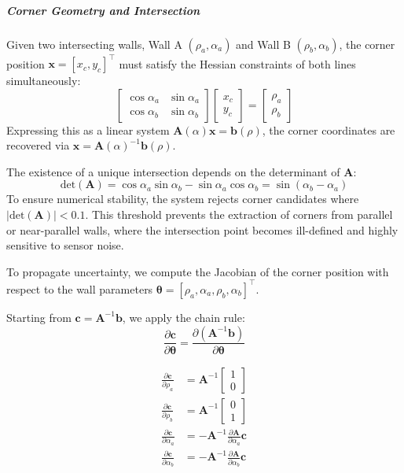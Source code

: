 \documentclass[11pt]{article}
\begin{document}
\subparagraph{Corner Geometry and Intersection}
Given two intersecting walls, Wall A $(\rho_a, \alpha_a)$ and Wall B $(\rho_b, \alpha_b)$, the corner position $\mathbf{x} = [x_c, y_c]^\top$ must satisfy the Hessian constraints of both lines simultaneously:
\begin{equation}
	\begin{bmatrix} \cos \alpha_a & \sin \alpha_a \\ \cos \alpha_b & \sin \alpha_b \end{bmatrix} \begin{bmatrix} x_c \\ y_c \end{bmatrix} = \begin{bmatrix} \rho_a \\ \rho_b \end{bmatrix}
\end{equation}
Expressing this as a linear system $\mathbf{A}(\alpha)\mathbf{x} = \mathbf{b}(\rho)$, the corner coordinates are recovered via $\mathbf{x} = \mathbf{A}(\alpha)^{-1} \mathbf{b}(\rho)$.

The existence of a unique intersection depends on the determinant of $\mathbf{A}$:
\begin{equation}
	\text{det}(\mathbf{A}) = \cos \alpha_a \sin \alpha_b - \sin \alpha_a \cos \alpha_b = \sin(\alpha_b - \alpha_a)
\end{equation}
To ensure numerical stability, the system rejects corner candidates where $|\text{det}(\mathbf{A})| < 0.1$. This threshold prevents the extraction of corners from parallel or near-parallel walls, where the intersection point becomes ill-defined and highly sensitive to sensor noise.

To propagate uncertainty, we compute the Jacobian of the corner position with respect to the wall parameters $\boldsymbol{\theta} = [\rho_a, \alpha_a, \rho_b, \alpha_b]^\top$.

Starting from $\mathbf{c} = \mathbf{A}^{-1} \mathbf{b}$, we apply the chain rule:
\begin{equation}
	\frac{\partial \mathbf{c}}{\partial \boldsymbol{\theta}} =
	\frac{\partial (\mathbf{A}^{-1} \mathbf{b})}{\partial \boldsymbol{\theta}}
\end{equation}


\begin{align}
	\frac{\partial \mathbf{c}}{\partial \rho_a} &= \mathbf{A}^{-1} \begin{bmatrix} 1 \\ 0 \end{bmatrix} \\
	\frac{\partial \mathbf{c}}{\partial \rho_b} &= \mathbf{A}^{-1} \begin{bmatrix} 0 \\ 1 \end{bmatrix} \\
	\frac{\partial \mathbf{c}}{\partial \alpha_a} &= -\mathbf{A}^{-1} \frac{\partial \mathbf{A}}{\partial \alpha_a} \mathbf{c} \\
	\frac{\partial \mathbf{c}}{\partial \alpha_b} &= -\mathbf{A}^{-1} \frac{\partial \mathbf{A}}{\partial \alpha_b} \mathbf{c}
\end{align}
\end{document}
